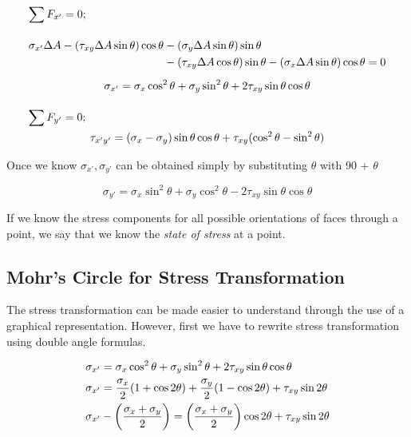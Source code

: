 \documentclass[
10pt,
a4paper,
openany,
svgnames,
]{book}
\begin{document}
\[ \begin{gathered}
  \sum F_{x'}  = 0; \hfill \\[1em]
  \begin{split}
    \sigma_{x'}\Delta A - (\tau_{xy}\Delta A\sin \theta )\cos \theta  &- (\sigma_y\Delta A\sin \theta )\sin \theta  \\
    &- (\tau_{xy}\Delta A\cos \theta )\sin \theta  - (\sigma_x\Delta A\sin \theta )\cos \theta  = 0
  \end{split} \nonumber \\[0.5em]
  \sigma_{x'} = \sigma_x\cos^2\theta  + \sigma_y\sin^2\theta  + 2\tau_{xy}\sin \theta \cos \theta  \\[1em]
  \sum F_{y'}  = 0; \hfill \\ 
  \tau_{x'y'} = (\sigma_x - \sigma_y)\sin \theta \cos \theta  + \tau_{xy}(\cos^2\theta  - \sin ^2\theta ) \\ 
\end{gathered} \]

Once we know $\sigma_{x’}, \sigma_{y’}$ can be obtained simply by substituting $\theta$ with 90 + $\theta$

\[\sigma_{y'} = \sigma_x\sin^2\theta  + \sigma_y\cos^2\theta  - 2\tau_{xy}\sin \theta \cos \theta \]

If we know the stress components for all possible orientations of faces through a point, we say that we know the \emph{state of stress} at a point.

\subsection{Mohr’s Circle for Stress Transformation}

The stress transformation can be made easier to understand through the use of a graphical representation. However, first we have to rewrite stress transformation using double angle formulas.

\[\begin{gathered}
  \sigma_{x'} = \sigma_x\cos^2\theta  + \sigma_y\sin^2\theta  + 2\tau_{xy}\sin \theta \cos \theta  \hfill \\
  \sigma _{x'} = \frac{\sigma_x}{2}(1 + \cos 2\theta ) + \frac{\sigma_y}{2}(1 - \cos 2\theta ) + {\tau_{xy}}\sin 2\theta  \hfill \\
  \sigma_{x'} - \left( \frac{\sigma_x + \sigma_y}{2} \right) = \left( \frac{\sigma_x + \sigma_y}{2} \right)\cos 2\theta  + {\tau_{xy}}\sin 2\theta  \hfill \\ 
\end{gathered} \]
\end{document}
